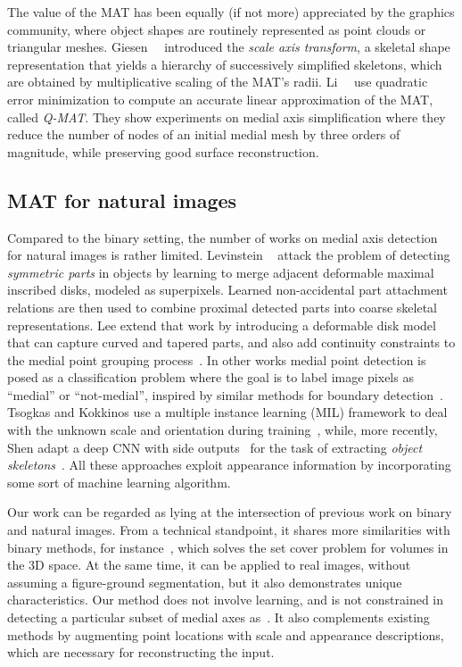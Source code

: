 \documentclass[10pt,twocolumn,letterpaper]{article}
\begin{document}
The value of the MAT has been equally (if not more) appreciated by the graphics community, where object shapes 
are routinely represented as point clouds or triangular meshes.
Giesen~\etal~\cite{giesen2009scale} introduced the \emph{scale axis transform}, a skeletal shape representation
that yields a hierarchy of successively simplified skeletons, which are obtained by multiplicative scaling of the
MAT's radii.
Li~\etal~\cite{li2015q} use quadratic error minimization to compute an accurate linear approximation of the MAT, called \emph{Q-MAT}.
They show experiments on medial axis simplification where they reduce the number of nodes of an initial medial mesh
by three orders of magnitude, while preserving good surface reconstruction.


\subsection{MAT for natural images}\label{sec:related:natural}
Compared to the binary setting, the number of works on medial axis detection for natural images is rather limited.
Levinstein \etal~\cite{levinshtein2009multiscale} attack the problem of detecting \emph{symmetric parts} in objects
by learning to merge adjacent deformable maximal inscribed disks, modeled as superpixels.
Learned non-accidental part attachment relations are then used to combine proximal detected parts into coarse skeletal representations.
Lee \etal extend that work by introducing a deformable disk model that can capture curved and tapered parts, and also add
continuity constraints to the medial point grouping process~\cite{lee2013detecting}.
In other works medial point detection is posed as a classification problem where the goal is to label image pixels
as ``medial'' or ``not-medial'', inspired by similar methods for boundary detection~\cite{martin2004learning,arbelaez2011contour}.
Tsogkas and Kokkinos use a multiple instance learning (MIL) framework to deal with the unknown scale and orientation 
during training~\cite{tsogkas2012learning}, while, more recently, Shen \etal adapt a deep CNN with 
side outputs~\cite{xie2015holistically} for the task of extracting \emph{object skeletons}~\cite{shen2016object}.
All these approaches exploit appearance information by incorporating some sort of machine learning algorithm.

Our work can be regarded as lying at the intersection of previous work on binary and natural images.
From a technical standpoint, it shares more similarities with binary methods, for instance~\cite{stolpner2012medial},
which solves the set cover problem for volumes in the 3D space.
At the same time, it can be applied to real images, without assuming a figure-ground segmentation,
but it also demonstrates unique characteristics.
Our method does not involve learning, and is not constrained in detecting a particular subset of
medial axes as~\cite{tsogkas2012learning,shen2016object}.
It also complements existing methods by augmenting point locations with scale and appearance descriptions, which
are necessary for reconstructing the input.
\end{document}
